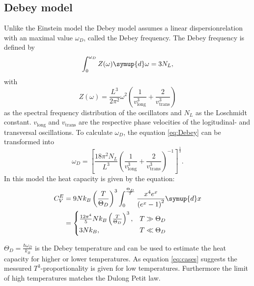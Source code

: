 \subsection{Debey model}
Unlike the Einstein model the Debey model assumes a linear dispersionrelation with an maximal value $\omega_D$, called the Debey frequency.
The Debey frequency is defined by
\begin{equation}
    \label{eq:Debey}
    \int_0^{\omega_D}Z(\omega) \symup{d}\omega = 3 N_L,
\end{equation}
with 
\begin{equation}
    Z(\omega) = \frac{L^3}{2\pi^2}\omega^2\left(\frac{1}{v_\text{long}^3}+\frac{2}{v_\text{trans}^3}\right)
\end{equation} 
as the spectral frequency distribution of the oscillators and $N_L$ as the Loschmidt constant.
$v_\text{long}$ and $v_\text{trans}$ are the respective phase velocities of the logitudinal- and transversal oscillations.
To calculate $\omega_D$, the equation \eqref{eq:Debey} can be transformed into
\begin{equation}
    \label{eq:omega}
    \omega_D = \left[\frac{18\pi^2N_L}{L^3}\left(\frac{1}{v_\text{long}^3}+\frac{2}{v_\text{trans}^3}\right)^{-1}\right]^\frac{1}{3}.
\end{equation}
In this model the heat capacity is given by the equation:
\begin{align}
    \label{eq:cvv}
    C_V^E &= 9Nk_B\left(\frac{T}{\Theta_D}\right)^3 \int_0^{\frac{\Theta_D}{T}}\frac{x^4e^x}{\left(e^x-1\right)^2} \symup{d}x \\
    & =
    \begin{cases}
    \frac{12\pi^4}{5}Nk_B\left(\frac{T}{\Theta_D}\right)^3 , & T \gg \Theta_D \\
    3Nk_B , & T \ll \Theta_D \label{eq:cases}
    \end{cases}
\end{align}

$\Theta_D=\frac{\hbar \omega_D}{k_B}$ is the Debey temperature and can be used to estimate the heat capacity for higher or lower temperatures.
As equation \eqref{eq:cases} suggests the messured $T^3$-proportionality is given for low temperatures. 
Furthermore the limit of high temperatures matches the Dulong Petit law.







